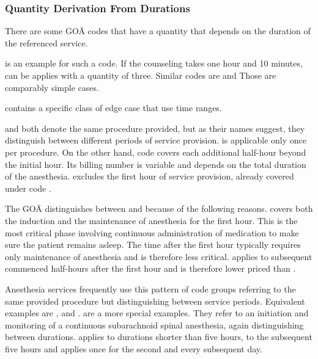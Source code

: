\subsubsection{Quantity Derivation From Durations}\label{subsubsec:quantity-derivation-from-durations}
There are some GOÄ codes that have a quantity that depends on the duration of the referenced service.

 is an example for such a code.
If the counseling takes one hour and 10 minutes,  can be applies with a quantity of three.
Similar codes are 
and 
Those are comparably simple cases.

 contains a specific class of edge case that use time ranges.

 and 
both denote the same procedure provided, but as their names suggest, they distinguish between different periods of service provision.
 is applicable only once per procedure.
On the other hand, code  covers each additional half-hour beyond the initial hour.
Its billing number is variable and depends on the total duration of the anesthesia.
 excludes the first hour of service provision, already covered under code .

The GOÄ distinguishes between  and  because of the following reasons.
 covers both the induction and the maintenance of anesthesia for the first hour.
This is the most critical phase involving continuous administration of medication to make sure the patient remains asleep.
The time after the first hour typically requires only maintenance of anesthesia and is therefore less critical.
 applies to subsequent commenced half-hours after the first hour and is therefore lower priced than .

Anesthesia services frequently use this pattern of code groups referring to the same provided procedure but distinguishing between service periods.
Equivalent examples are ,  and .
 are a more special examples.
They refer to an initiation and monitoring of a continuous subarachnoid spinal anesthesia, again distinguishing between durations.
 applies to durations shorter than five hours,  to the subsequent five hours and  applies once for the second and every subsequent day.

